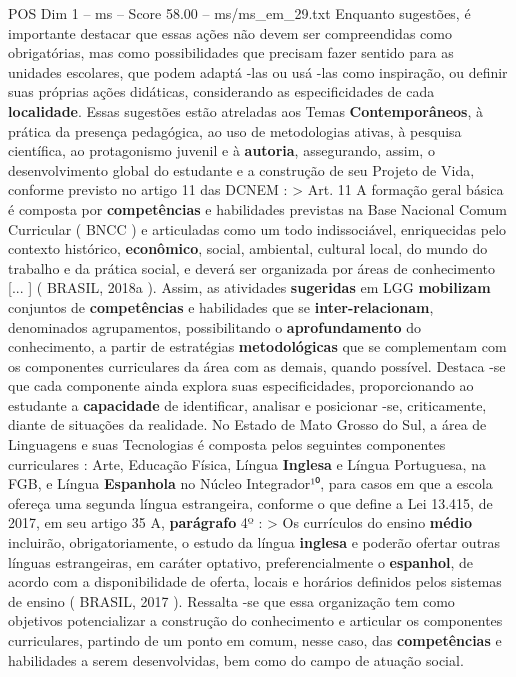 \begin{textsample}{POS Dim 1 – ms – Score 58.00 – ms/ms\_em\_29.txt}
Enquanto sugestões, é importante destacar que essas ações não devem ser compreendidas como obrigatórias, mas como possibilidades que precisam fazer sentido para as unidades escolares, que podem adaptá -las ou usá -las como inspiração, ou definir suas próprias ações didáticas, considerando as especificidades de cada \textbf{localidade}.
Essas sugestões estão atreladas aos Temas \textbf{Contemporâneos}, à prática da presença pedagógica, ao uso de metodologias ativas, à pesquisa científica, ao protagonismo juvenil e à \textbf{autoria}, assegurando, assim, o desenvolvimento global do estudante e a construção de seu Projeto de Vida, conforme previsto no artigo 11 das DCNEM : > Art. 11 A formação geral básica é composta por \textbf{competências} e habilidades previstas na Base Nacional Comum Curricular ( BNCC ) e articuladas como um todo indissociável, enriquecidas pelo contexto histórico, \textbf{econômico}, social, ambiental, cultural local, do mundo do trabalho e da prática social, e deverá ser organizada por áreas de conhecimento [... ] ( BRASIL, 2018a ).
Assim, as atividades \textbf{sugeridas} em LGG \textbf{mobilizam} conjuntos de \textbf{competências} e habilidades que se \textbf{inter-relacionam}, denominados agrupamentos, possibilitando o \textbf{aprofundamento} do conhecimento, a partir de estratégias \textbf{metodológicas} que se complementam com os componentes curriculares da área com as demais, quando possível.
Destaca -se que cada componente ainda explora suas especificidades, proporcionando ao estudante a \textbf{capacidade} de identificar, analisar e posicionar -se, criticamente, diante de situações da realidade.
No Estado de Mato Grosso do Sul, a área de Linguagens e suas Tecnologias é composta pelos seguintes componentes curriculares : Arte, Educação Física, Língua \textbf{Inglesa} e Língua Portuguesa, na FGB, e Língua \textbf{Espanhola} no Núcleo Integrador¹⁰, para casos em que a escola ofereça uma segunda língua estrangeira, conforme o que define a Lei 13.415, de 2017, em seu artigo 35 A, \textbf{parágrafo} 4º : > Os currículos do ensino \textbf{médio} incluirão, obrigatoriamente, o estudo da língua \textbf{inglesa} e poderão ofertar outras línguas estrangeiras, em caráter optativo, preferencialmente o \textbf{espanhol}, de acordo com a disponibilidade de oferta, locais e horários definidos pelos sistemas de ensino ( BRASIL, 2017 ).
Ressalta -se que essa organização tem como objetivos potencializar a construção do conhecimento e articular os componentes curriculares, partindo de um ponto em comum, nesse caso, das \textbf{competências} e habilidades a serem desenvolvidas, bem como do campo de atuação social.

\end{textsample}
